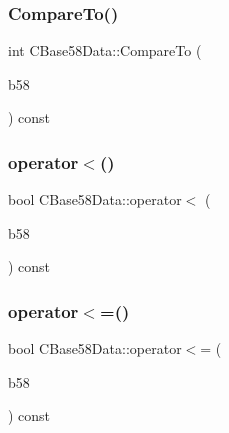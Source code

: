 \subsubsection{\texorpdfstring{Compare\+To()}{CompareTo()}}
{\footnotesize\ttfamily int C\+Base58\+Data\+::\+Compare\+To (\begin{DoxyParamCaption}\item[{const \mbox{\hyperlink{class_c_base58_data}{C\+Base58\+Data}} \&}]{b58 }\end{DoxyParamCaption}) const}

\mbox{\label{class_c_base58_data_a7377c5628c43551ca22af1c0dfbaebae}} 
\subsubsection{\texorpdfstring{operator$<$()}{operator<()}}
{\footnotesize\ttfamily bool C\+Base58\+Data\+::operator$<$ (\begin{DoxyParamCaption}\item[{const \mbox{\hyperlink{class_c_base58_data}{C\+Base58\+Data}} \&}]{b58 }\end{DoxyParamCaption}) const\hspace{0.3cm}{\ttfamily [inline]}}

\mbox{\label{class_c_base58_data_a1d99c2d0a82cbe648ba2a99e41386486}} 
\subsubsection{\texorpdfstring{operator$<$=()}{operator<=()}}
{\footnotesize\ttfamily bool C\+Base58\+Data\+::operator$<$= (\begin{DoxyParamCaption}\item[{const \mbox{\hyperlink{class_c_base58_data}{C\+Base58\+Data}} \&}]{b58 }\end{DoxyParamCaption}) const\hspace{0.3cm}{\ttfamily [inline]}}

\mbox{\label{class_c_base58_data_a2e7a634c3a008adf3f74d72ed9dbd68c}} 
